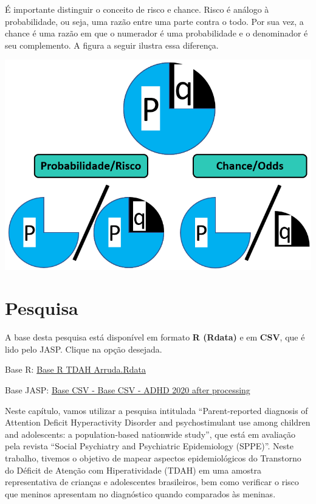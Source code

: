 \documentclass[
]{book}
\newenvironment{base}{
  \definecolor{shadecolor}{rgb}{0.972,0.972,0.972}  %
  \color{black}
  \begin{shaded}}
 {\end{shaded}}
\begin{document}
É importante distinguir o conceito de risco e chance. Risco é análogo à probabilidade, ou seja, uma razão entre uma parte contra o todo. Por sua vez, a chance é uma razão em que o numerador é uma probabilidade e o denominador é seu complemento. A figura a seguir ilustra essa diferença.

\includegraphics{./img/cap_reg_log_odds.png}

\hypertarget{pesquisa-2}{%
\section{Pesquisa}\label{pesquisa-2}}

\begin{base}
A base desta pesquisa está disponível em formato \textbf{R (Rdata)} e em \textbf{CSV}, que é lido pelo JASP. Clique na opção desejada.

Base R: \href{https://github.com/anovabr/mqt/raw/master/bases/Base\%20R\%20TDAH\%20Arruda.RData}{Base R TDAH Arruda.Rdata}

Base JASP: \href{https://github.com/anovabr/mqt/raw/master/bases/bases_csv_jasp.zip}{Base CSV - Base CSV - ADHD 2020 after processing}

\end{base}

Neste capítulo, vamos utilizar a pesquisa intitulada ``Parent-reported diagnosis of Attention Deficit Hyperactivity Disorder and psychostimulant use among children and adolescents: a population-based nationwide study'', que está em avaliação pela revista ``Social Psychiatry and Psychiatric Epidemiology (SPPE)''. Neste trabalho, tivemos o objetivo de mapear aspectos epidemiológicos do Transtorno do Déficit de Atenção com Hiperatividade (TDAH) em uma amostra representativa de crianças e adolescentes brasileiros, bem como verificar o risco que meninos apresentam no diagnóstico quando comparados às meninas.
\end{document}
